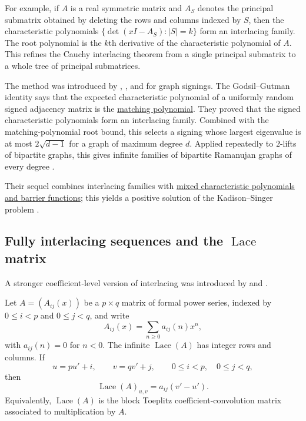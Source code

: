 For example, if $A$ is a real symmetric matrix and $A_S$ denotes the
principal submatrix obtained by deleting the rows and columns indexed by
$S$, then the characteristic polynomials $\{\det(xI-A_S): |S|=k\}$
form an interlacing family.  The root polynomial is the $k$th derivative
of the characteristic polynomial of $A$.  This refines the Cauchy
interlacing theorem from a single principal submatrix to a whole tree of
principal submatrices.

The method was introduced by , , and
 for graph signings.  The Godsil--Gutman identity says
that the expected characteristic polynomial of a uniformly random signed
adjacency matrix is the \hyperref[realRootedMatching]{matching polynomial}.
They proved that the signed characteristic polynomials form an interlacing
family.  Combined with the matching-polynomial root bound, this selects a
signing whose largest eigenvalue is at most $2\sqrt{d-1}$ for a graph of
maximum degree $d$.  Applied repeatedly to $2$-lifts of bipartite graphs, this
gives infinite families of bipartite Ramanujan graphs of every degree
\cite{MarcusSpielmanSrivastava2015I}.

Their sequel combines interlacing families with
\hyperref[mixedCharacteristicPolynomial]{mixed characteristic polynomials and
barrier functions}; this yields a positive solution of the Kadison--Singer
problem \cite{MarcusSpielmanSrivastava2015II}.


\subsection[fullyInterlacingLace]{Fully interlacing sequences and the $\operatorname{Lace}$ matrix}

A stronger coefficient-level version of interlacing was introduced by
 and 
\cite{AthanasiadisWagner2024x}.

\begin{definition}
Let $A=(A_{ij}(x))$ be a $p \times q$ matrix of formal power series, indexed by
$0 \leq i \lt p$ and $0 \leq j \lt q$, and write
\[
 A_{ij}(x)=\sum_{n\geq 0} a_{ij}(n)x^n,
\]
with $a_{ij}(n)=0$ for $n \lt 0$.
The infinite \label{laceMatrix}
$\operatorname{Lace}(A)$ has integer rows and columns.
If
\[
 u=pu' + i,\qquad v=qv' + j,\qquad 0\leq i \lt p,\quad 0\leq j \lt q,
\]
then
\[
 \operatorname{Lace}(A)_{u,v}=a_{ij}(v'-u').
\]
Equivalently, $\operatorname{Lace}(A)$ is the block Toeplitz
coefficient-convolution matrix associated to multiplication by $A$.
\end{definition}

